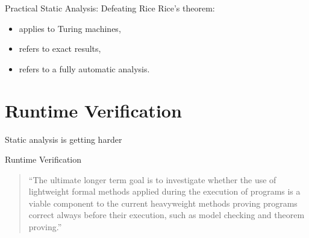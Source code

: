 \documentclass[12pt]{beamer}
\begin{document}
\begin{frame}{Practical Static Analysis: \small Defeating Rice}
  Rice's theorem:
  \begin{itemize}
    \item applies to Turing machines,
    \item refers to exact results,
    \item refers to a fully automatic analysis.
  \end{itemize}


\end{frame}


\section{Runtime Verification}
\label{sec:runver}

\begin{frame}
  \begin{center}
    \Large Static analysis is getting harder

  \end{center}
\end{frame}

\begin{frame}{Runtime Verification}

  \begin{quote}
    ``The ultimate longer term goal is to investigate whether the use of
    lightweight formal methods applied during the execution of
    programs is a viable component to the current heavyweight methods
    proving programs correct always before their execution, such as
    model checking and theorem proving.''

  \end{quote}
\end{frame}
\end{document}
